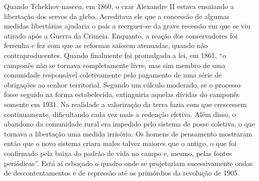 Quando Tchekhov nasceu, em 1860, o czar Alexandre II estava ensaiando a
libertação dos servos da gleba. Acreditava ele que a concessão de
algumas medidas libertárias ajudaria o país a reerguer-se da grave
recessão em que se viu atirado após a Guerra da Crimeia. Enquanto, a
reação dos conservadores foi ferrenha e fez com que as reformas saíssem
atenuadas, quando não contraproducentes. Quando finalmente foi
promulgada a lei, em 1861, ``o camponês não se tornava completamente
livre, mas sim membro de uma comunidade responsável coletivamente pelo
pagamento de uma série de obrigações ao senhor territorial. Segundo um
cálculo moderado, se o processo fosse seguido na forma estabelecida,
extinguiria aquelas dívidas do camponês somente em 1931. Na realidade a
valorização da terra fazia com que crescessem continuamente,
dificultando cada vez mais a redenção efetiva. Além disso, o abandono da
comunidade rural era impedido pelo sistema de posse coletiva, o que
tornava a libertação uma medida irrisória. Os homens de pensamento
mostraram então que o novo sistema criara males talvez maiores que o
antigo, o que foi confirmado pela baixa do padrão de vida no campo e,
mesmo, pelas fontes periódicas''. Está aí esboçado o quadro onde se
projetariam sucessivamente ondas de descontentamentos e de repressão até
os primórdios da revolução de 1905.

